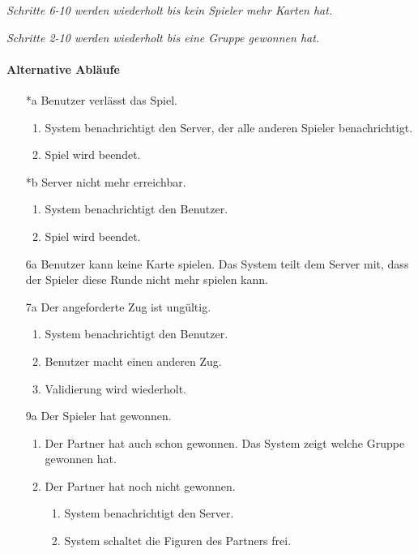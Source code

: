 \documentclass[12pt,halfparskip]{scrartcl}
\begin{document}
\emph{Schritte 6-10 werden wiederholt bis kein Spieler mehr Karten hat.}

\emph{Schritte 2-10 werden wiederholt bis eine Gruppe gewonnen hat.}

\newpage
\paragraph{Alternative Abläufe}
\begin{enumerate}
	\item[*a] Benutzer verlässt das Spiel.
	\begin{enumerate}
		\item System benachrichtigt den Server, der alle anderen Spieler benachrichtigt.
		\item Spiel wird beendet.
	\end{enumerate}
	
	\item[*b] Server nicht mehr erreichbar.
	\begin{enumerate}
		\item System benachrichtigt den Benutzer.
		\item Spiel wird beendet.
	\end{enumerate}
	
	\item[6a] Benutzer kann keine Karte spielen.\newline
	Das System teilt dem Server mit, dass der Spieler diese Runde nicht mehr spielen kann.
	
	\item[7a] Der angeforderte Zug ist ungültig.
	\begin{enumerate}
		\item System benachrichtigt den Benutzer.
		\item Benutzer macht einen anderen Zug.
		\item Validierung wird wiederholt.
	\end{enumerate}
	
	\item[9a] Der Spieler hat gewonnen.
	\begin{enumerate}
		\item Der Partner hat auch schon gewonnen.\newline
		Das System zeigt welche Gruppe gewonnen hat.
		\item Der Partner hat noch nicht gewonnen.
		\begin{enumerate}
			\item System benachrichtigt den Server.
			\item System schaltet die Figuren des Partners frei.
		\end{enumerate}
	\end{enumerate}
\end{enumerate}
\end{document}
